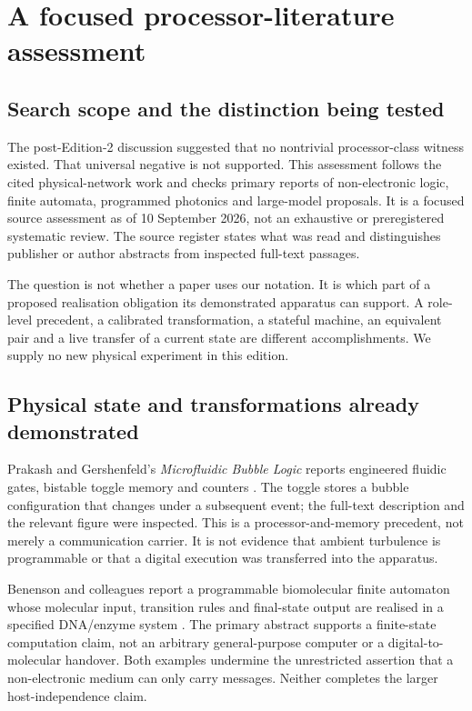 \section{A focused processor-literature assessment}\label{sec:census}
\subsection{Search scope and the distinction being tested}
The post-Edition-2 discussion suggested that no nontrivial processor-class witness existed. That universal negative is not supported. This assessment follows the cited physical-network work and checks primary reports of non-electronic logic, finite automata, programmed photonics and large-model proposals. It is a focused source assessment as of 10 September 2026, not an exhaustive or preregistered systematic review. The source register states what was read and distinguishes publisher or author abstracts from inspected full-text passages.

The question is not whether a paper uses our notation. It is which part of a proposed realisation obligation its demonstrated apparatus can support. A role-level precedent, a calibrated transformation, a stateful machine, an equivalent pair and a live transfer of a current state are different accomplishments. We supply no new physical experiment in this edition.

\subsection{Physical state and transformations already demonstrated}
Prakash and Gershenfeld's \emph{Microfluidic Bubble Logic} reports engineered fluidic gates, bistable toggle memory and counters \citep{bubble}. The toggle stores a bubble configuration that changes under a subsequent event; the full-text description and the relevant figure were inspected. This is a processor-and-memory precedent, not merely a communication carrier. It is not evidence that ambient turbulence is programmable or that a digital execution was transferred into the apparatus.

Benenson and colleagues report a programmable biomolecular finite automaton whose molecular input, transition rules and final-state output are realised in a specified DNA/enzyme system \citep{benenson}. The primary abstract supports a finite-state computation claim, not an arbitrary general-purpose computer or a digital-to-molecular handover. Both examples undermine the unrestricted assertion that a non-electronic medium can only carry messages. Neither completes the larger host-independence claim.

